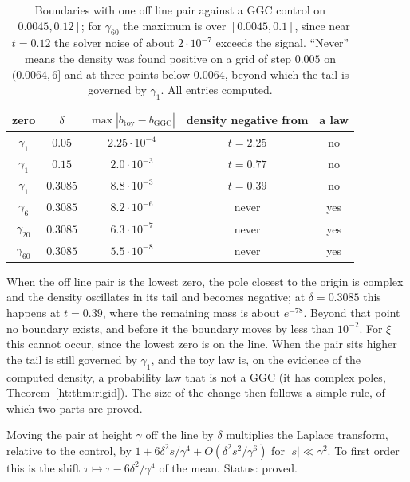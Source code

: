 \begin{table}[ht]
\centering\footnotesize
\begin{tabular}{ccccc}
\toprule
zero & $\delta$ & $\max|b_{\mathrm{toy}}-b_{\mathrm{GGC}}|$ & density negative from & a law \\
\midrule
$\gamma_1$ & $0.05$ & $2.25\cdot10^{-4}$ & $t=2.25$ & no \\
$\gamma_1$ & $0.15$ & $2.0\cdot10^{-3}$ & $t=0.77$ & no \\
$\gamma_1$ & $0.3085$ & $8.8\cdot10^{-3}$ & $t=0.39$ & no \\
$\gamma_6$ & $0.3085$ & $8.2\cdot10^{-6}$ & never & yes \\
$\gamma_{20}$ & $0.3085$ & $6.3\cdot10^{-7}$ & never & yes \\
$\gamma_{60}$ & $0.3085$ & $5.5\cdot10^{-8}$ & never & yes \\
\bottomrule
\end{tabular}
\caption{Boundaries with one off line pair against a GGC control on $[0.0045,0.12]$; for $\gamma_{60}$ the maximum is over $[0.0045,0.1]$, since near $t=0.12$ the solver noise of about $2\cdot10^{-7}$ exceeds the signal. ``Never'' means the density was found positive on a grid of step $0.005$ on $(0.0064,6]$ and at three points below $0.0064$, beyond which the tail is governed by $\gamma_1$. All entries computed.}\label{ht:tab:ifpt}
\end{table}

When the off line pair is the lowest zero, the pole closest to the origin is complex and the density oscillates in its tail and becomes negative; at $\delta=0.3085$ this happens at $t=0.39$, where the remaining mass is about $e^{-78}$. Beyond that point no boundary exists, and before it the boundary moves by less than $10^{-2}$. For $\xi$ this cannot occur, since the lowest zero is on the line. When the pair sits higher the tail is still governed by $\gamma_1$, and the toy law is, on the evidence of the computed density, a probability law that is not a GGC (it has complex poles, Theorem~\ref{ht:thm:rigid}). The size of the change then follows a simple rule, of which two parts are proved.

\begin{proposition}\label{ht:prop:resp}
Moving the pair at height $\gamma$ off the line by $\delta$ multiplies the Laplace transform, relative to the control, by $1+6\delta^2s/\gamma^4+O(\delta^2s^2/\gamma^6)$ for $|s|\ll\gamma^2$. To first order this is the shift $\tau\mapsto\tau-6\delta^2/\gamma^4$ of the mean. Status: proved.
\end{proposition}

